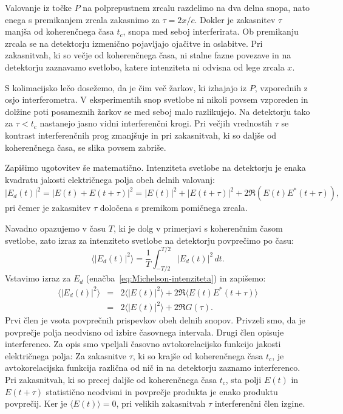 Valovanje iz točke $P$ na polprepustnem zrcalu razdelimo na dva delna snopa, 
nato enega s premikanjem zrcala zakasnimo za $\tau=2x/c$. Dokler je zakasnitev
$\tau$ manjša od koherenčnega časa $t_{c}$, snopa med seboj interferirata.
Ob premikanju zrcala se na detektorju izmenično pojavljajo ojačitve in 
oslabitve. Pri zakasnitvah, ki so večje od koherenčnega časa, ni stalne fazne 
povezave in na detektorju zaznavamo svetlobo, katere intenziteta ni odvisna od lege
zrcala $x$.

\begin{remark}
S kolimacijsko lečo dosežemo, da je čim več žarkov, ki izhajajo iz
$P$, vzporednih z osjo interferometra. V eksperimentih snop svetlobe 
ni nikoli povsem vzporeden in dolžine poti posameznih žarkov se med
seboj malo razlikujejo. Na detektorju tako za $\tau < t_c$ nastanejo jasno 
vidni interferenčni krogi. Pri večjih vrednostih $\tau$  se kontrast interferenčnih
prog zmanjšuje in pri zakasnitvah, ki so daljše od koherenčnega časa, se 
slika povsem zabriše. 
\end{remark}

Zapišimo ugotovitev še matematično.
Intenziteta svetlobe na detektorju je enaka kvadratu jakosti električnega
polja obeh delnih valovanj:
\begin{equation}
|E_{d}(t)|^{2}=|E(t)+E(t+\tau)|^{2}=|E(t)|^{2}+|E(t+\tau)|^{2}+2\Re \left(E(t)E^{*}(t+\tau)\right)\!\!,
\label{eq:Michelson-intenziteta}
\end{equation}
pri čemer je zakasnitev $\tau$ določena s premikom pomičnega zrcala.

Navadno opazujemo v času $T$, ki je dolg v primerjavi s koherenčnim
časom svetlobe, zato izraz za intenziteto svetlobe na detektorju povprečimo po času:
\begin{equation}
\langle|E_{d}(t)|^{2}\rangle = \frac{1}{T}\int_{-T/2}^{T/2}|E{}_{d}(t)|^{2}\, dt.
\end{equation}
Vstavimo izraz za $E_d$ (enačba~\ref{eq:Michelson-intenziteta}) in zapišemo:
\begin{eqnarray}
\langle|E_{d}(t)|^{2}\rangle & = & 2\langle|E(t)|^{2}\rangle+2\Re\langle E(t)E^{*}(t+\tau)\rangle \nonumber \\ 
&=& 2\langle|E(t)|^{2}\rangle+2\Re G(\tau).
 \label{eq:caskohav}
\end{eqnarray}
Prvi člen je vsota povprečnih prispevkov obeh delnih snopov. Privzeli smo, 
da je povprečje polja neodvisno od izbire časovnega intervala.
Drugi člen opisuje interferenco. 
Za opis smo vpeljali
časovno avtokorelacijsko funkcijo
jakosti električnega polja:
Za zakasnitve $\tau$, ki so krajše od koherenčnega časa $t_c$, je avtokorelacijska
funkcija različna od nič in na
detektorju zaznamo interferenco. Pri zakasnitvah, ki so precej
daljše od koherenčnega časa $t_{c}$, sta polji $E(t)$ in $E(t+\tau)$
statistično neodvisni in povprečje produkta je enako produktu povprečij.
Ker je $\langle E(t)\rangle=0$, pri velikih zakasnitvah $\tau$ interferenčni
člen izgine.

